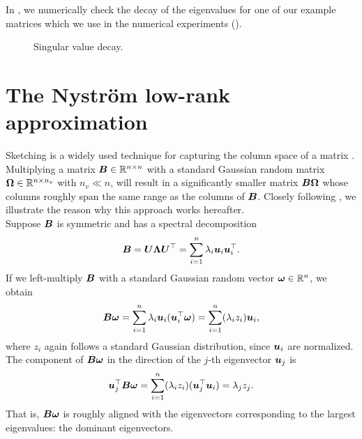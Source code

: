 In , we numerically check the decay
of the eigenvalues for one of our example matrices which we use in the numerical
experiments ().
\begin{figure}[ht]
    \centering
    \caption{Singular value decay. }
    \label{fig:3-nystrom-singular-value-decay}
\end{figure}


\section{The Nystr\"om low-rank approximation}
\label{sec:3-nystrom-nystrom}

Sketching is a widely used technique for capturing the column space of a matrix
\cite{halko2011finding,woodruff2014sketching,lin2017randomized,tropp2017sketching,tropp2023randomized}.
Multiplying a matrix $\boldsymbol{B} \in \mathbb{R}^{n \times n}$ with a standard Gaussian
random matrix $\boldsymbol{\Omega} \in \mathbb{R}^{n \times n_v}$ with $n_v \ll n$, will
result in a significantly smaller matrix $\boldsymbol{B}\boldsymbol{\Omega}$ whose
columns roughly span the same range as the columns of $\boldsymbol{B}$.
Closely following \cite[Section~2.1]{tropp2023randomized}, we illustrate the
reason why this approach works hereafter.\\
Suppose $\boldsymbol{B}$ is symmetric and has a spectral decomposition
\begin{equation}
    \boldsymbol{B}
        = \boldsymbol{U} \boldsymbol{\Lambda} \boldsymbol{U}^{\top} 
        = \sum_{i=1}^n \lambda_i \boldsymbol{u}_i \boldsymbol{u}_i^{\top}.
    \label{equ:3-nystrom-sketching-spectral-decomposition}
\end{equation}
If we left-multiply $\boldsymbol{B}$ with a standard Gaussian random vector $\boldsymbol{\omega} \in \mathbb{R}^n$,
we obtain
\begin{equation}
    \boldsymbol{B}\boldsymbol{\omega}
        = \sum_{i=1}^n \lambda_i \boldsymbol{u}_i (\boldsymbol{u}_i^{\top} \boldsymbol{\omega})
        = \sum_{i=1}^n (\lambda_i  z_i) \boldsymbol{u}_i,
        \label{equ:3-nystrom-sketching-random-multiplication}
\end{equation}
where $z_i$ again follows a standard Gaussian distribution, since $\boldsymbol{u}_i$ are
normalized. The component of $\boldsymbol{B}\boldsymbol{\omega}$ in the direction of the
$j$-th eigenvector $\boldsymbol{u}_j$ is
\begin{equation}
    \boldsymbol{u}_j^{\top}\boldsymbol{B}\boldsymbol{\omega}
        = \sum_{i=1}^n (\lambda_i  z_i) (\boldsymbol{u}_j^{\top} \boldsymbol{u}_i)
        = \lambda_j  z_j.
        \label{equ:3-nystrom-sketching-dominant-component}
\end{equation}
That is, $\boldsymbol{B}\boldsymbol{\omega}$ is roughly aligned with the eigenvectors corresponding
to the largest eigenvalues: the dominant eigenvectors.\\

